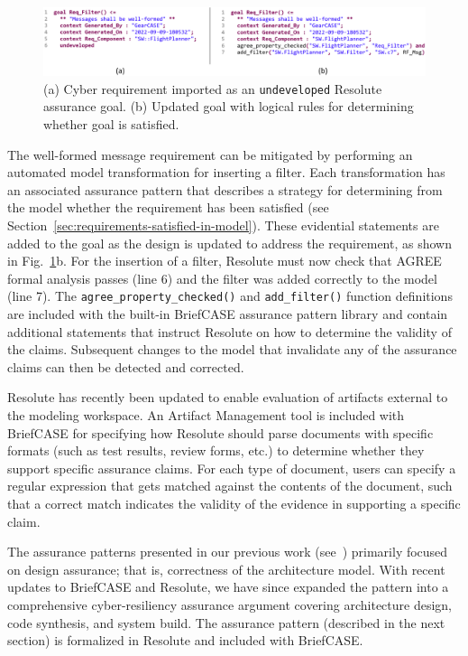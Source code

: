 \begin{figure}[h] 
	\centering 
	\includegraphics[width=\textwidth]{figs/resolute-requirement.png}
	\caption{(a) Cyber requirement imported as an \texttt{undeveloped} Resolute assurance goal.  (b) Updated goal with logical rules for determining whether goal is satisfied.}
	\label{fig:resolute-requirement} 
\end{figure}

The well-formed message requirement can be mitigated by performing an automated model transformation for inserting a filter. Each transformation has an associated assurance pattern that describes a strategy for determining from the model whether the requirement has been satisfied (see Section~\ref{sec:requirements-satisfied-in-model}).  
These evidential statements are added to the goal as the design is updated to address the requirement, as shown in Fig.~\ref{fig:resolute-requirement}b.  For the insertion of a filter, Resolute must now check that AGREE formal analysis passes (line 6) and the filter was added correctly to the model (line 7).  The \texttt{agree\_property\_checked()} and \texttt{add\_filter()} function definitions are included with the built-in BriefCASE assurance pattern library and contain additional statements that instruct Resolute on how to determine the validity of the claims. 
Subsequent changes to the model that invalidate any of the assurance claims can then be detected and corrected.  

Resolute has recently been updated to enable evaluation of artifacts external to the modeling workspace. An Artifact Management tool is included with BriefCASE for specifying how Resolute should parse documents with specific formats (such as test results, review forms, etc.) to determine whether they support specific assurance claims.  For each type of document, users can specify a regular expression that gets matched against the contents of the document, such that a correct match indicates the validity of the evidence in supporting a specific claim.

The assurance patterns presented in our previous work (see~\cite{resolute-destion}) primarily focused on design assurance; that is, correctness of the architecture model.  With recent updates to BriefCASE and Resolute, we have since expanded the pattern into a comprehensive cyber-resiliency assurance argument covering architecture design, code synthesis, and system build.  The assurance pattern (described in the next section) is formalized in Resolute and included with BriefCASE.
%
